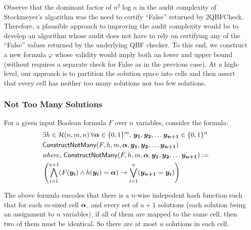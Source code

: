 

Observe that the dominant factor of $n^2\log n$ in the audit complexity of Stockmeyer's algorithm was the need to certify ``False'' returned by 2QBFCheck. Therefore, a plausible approach to improving the audit complexity would be to develop an algorithm whose audit does not have to rely on certifying any of the ``False'' values returned by the underlying QBF checker.  To this end, we construct a new formula $\varphi$ whose validity would imply both an lower and upper bound (without requires a separate check for False as in the previous case). At a high-level, our approach is to partition the solution space into cells and then assert that every cell has neither too many solutions nor too few solutions. 


\subsubsection*{Not Too Many Solutions}

For a given input Boolean formula $F$ over $n$ variables, consider the formula:
\begin{align*}

  &\exists h \in \mathcal{H}(n,m,n) \, \forall \vecbold{\alpha} \in \{0,1\}^m, \, \vecbold{y_1}, \vecbold{y_2}, \ldots \vecbold{y_{u+1}}\in \{0,1\}^n\\
&\mathsf{ConstructNotMany}(F,h, m, \vecbold{\alpha}, \vecbold{y_1},\vecbold{y_2}, \ldots \vecbold{y_{u+1}})\\


&\text{\it where, }
\mathsf{ConstructNotMany}(F,h, m, \vecbold{\alpha}, \vecbold{y_1},\vecbold{y_2}, \ldots \vecbold{y_{u+1}}):=\\
&  \left(\bigwedge_{i=1}^{u+1} (F(\vecbold{y_i}) \wedge h(\vecbold{y_i}) = \vecbold{\alpha}) \rightarrow  \bigvee_{i=1}^{u} (\vecbold{y_{u+1}} = \vecbold{y_i}) \right)\nonumber
\end{align*}

The above formula encodes that there is a $n$-wise indepedent hash function such that for each $m$-sized cell ${\boldsymbol{\alpha}}$, and every set of $u+1$ solutions (each solution being an assignment to $n$ variables), if all of them are mapped to the same cell, then two of them must be identical. So there are at most $u$ solutions in each cell. 


